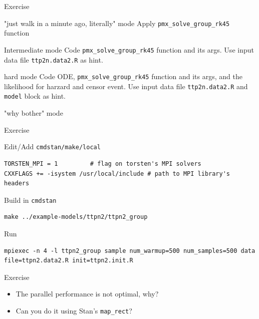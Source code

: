 \documentclass[presentation]{beamer}
\begin{document}
\begin{frame}[fragile,label={sec:org1762e5d}]{Exercise}
 \begin{block}{"just walk in a minute ago, literally" mode}
Apply \texttt{pmx\_solve\_group\_rk45} function
\end{block}
\begin{block}{Intermediate mode}
Code \texttt{pmx\_solve\_group\_rk45} function and its args. Use input data file \texttt{ttp2n.data2.R} as hint.
\end{block}
\begin{block}{hard mode}
Code ODE, \texttt{pmx\_solve\_group\_rk45} function and its args,
and the likelihood for harzard and censor event. Use input
data file \texttt{ttp2n.data2.R} and \texttt{model} block as hint.
\end{block}
\begin{block}{"why bother" mode}
\end{block}
\end{frame}

\begin{frame}[fragile,label={sec:orgad2b661}]{Exercise}
 \begin{block}{Edit/Add \texttt{cmdstan/make/local}}
\begin{verbatim}
TORSTEN_MPI = 1         # flag on torsten's MPI solvers
CXXFLAGS += -isystem /usr/local/include # path to MPI library's headers
\end{verbatim}
\end{block}
\begin{block}{Build in \texttt{cmdstan}}
\begin{verbatim}
make ../example-models/ttpn2/ttpn2_group
\end{verbatim}
\end{block}
\begin{block}{Run}
\begin{verbatim}
mpiexec -n 4 -l ttpn2_group sample num_warmup=500 num_samples=500 data file=ttpn2.data2.R init=ttpn2.init.R
\end{verbatim}
\end{block}
\end{frame}

\begin{frame}[fragile,label={sec:orga54e7b7}]{Exercise}
 \begin{itemize}
\item The parallel performance is not optimal, why?
\item Can you do it using Stan's \texttt{map\_rect}?
\end{itemize}
\end{frame}
\end{document}
